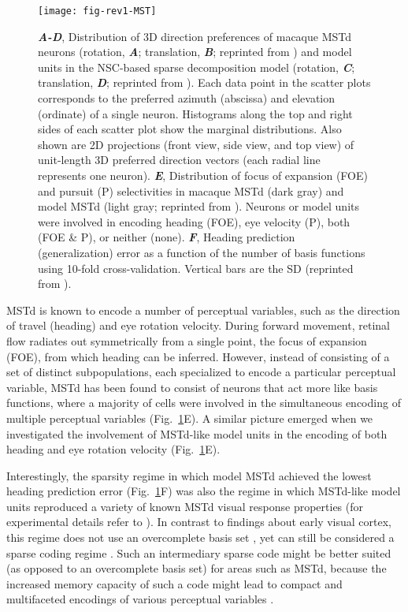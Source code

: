 \begin{figure}[ht]
	\centering
	\texttt{[image: fig-rev1-MST]}
    \caption{
    \textbf{\emph{A-D}},
         Distribution of 3D direction preferences of macaque \ac{MSTd} neurons
         (rotation, \textbf{\emph{A}}; translation, \textbf{\emph{B}}; 
         reprinted from \cite{Takahashi2007})
         and model units in the \ac{NSC}-based sparse decomposition model
         (rotation, \textbf{\emph{C}}; translation, \textbf{\emph{D}}; 
         reprinted from \cite{Beyeler2016}).
         Each data point in the scatter plots corresponds to the preferred azimuth
         (abscissa) and elevation (ordinate) of a single neuron.
         Histograms along the top and right sides of each scatter plot show the
         marginal distributions.
         Also shown are 2D projections (front view, side view, and top view)
         of unit-length 3D preferred direction vectors (each radial line represents
         one neuron).
    \textbf{\emph{E}},
         Distribution of focus of expansion (FOE) and pursuit (P) selectivities
         in macaque \ac{MSTd} (dark gray) and model \ac{MSTd} (light gray;
         reprinted from \cite{Beyeler2016}).
         Neurons or model units were involved in encoding heading (FOE),
         eye velocity (P), both (FOE \& P), or neither (none).
    \textbf{\emph{F}},
         Heading prediction (generalization) error as a function of the
         number of basis functions using 10-fold cross-validation.
         Vertical bars are the SD (reprinted from \cite{Beyeler2016}).
    }
	\label{fig:NMF|MSTd}
\end{figure}

\ac{MSTd} is known to encode a number of perceptual variables,
such as the direction of travel (heading) and eye rotation velocity.
During forward movement, retinal flow radiates out symmetrically from a single point,
the focus of expansion (FOE), from which heading can be inferred.
However, instead of consisting of a set of distinct subpopulations,
each specialized to encode a particular perceptual variable,
\ac{MSTd} has been found to consist of neurons that act more like basis functions,
where a majority of cells were involved in the simultaneous encoding of multiple
perceptual variables (Fig.~\ref{fig:NMF|MSTd}E).
A similar picture emerged when we investigated the involvement of \ac{MSTd}-like
model units in the encoding of both heading and eye rotation velocity
(Fig.~\ref{fig:NMF|MSTd}E).

Interestingly, the sparsity regime in which model \ac{MSTd} achieved the
lowest heading prediction error (Fig.~\ref{fig:NMF|MSTd}F) was also the
regime in which \ac{MSTd}-like model units reproduced a variety of known
\ac{MSTd} visual response properties
(for experimental details refer to \cite{Beyeler2016}).
In contrast to findings about early visual cortex,
this regime does not use an overcomplete basis set \cite{OlshausenField1996},
yet can still be considered a sparse coding regime \cite{SpanneJorntell2015}.
Such an intermediary sparse code might be better suited
(as opposed to an overcomplete basis set)
for areas such as \ac{MSTd},
because the increased memory capacity of such a code might lead to compact
and multifaceted encodings of various perceptual variables
\cite{BenHamed2003}.


